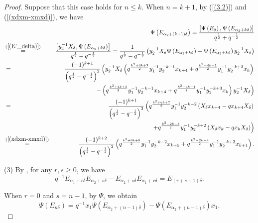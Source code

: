 \documentclass[reqno,11pt]{amsart}
\numberwithin{equation}{section}
\begin{document}
\begin{proof}
Suppose that this case holds for $n \le k$. When $n=k+1$, by (\ref{(3.2)}) and (\ref{(xdxm-xmxd)}), we have
\begin{eqnarray*}
	&& \Psi\left(E_{\alpha_2+(k+1) \delta}\right)=\frac{{\left[ {\Psi \left( {{E_\delta }} \right),\Psi \left( {{E_{{\alpha _2} + k\delta }}} \right)} \right]}}{{{q^{\frac{1}{2}}} + {q^{ - \frac{1}{2}}}}} \\
&	 \mathop  = \limits^{ (\ref{(E'_delta)})} & \frac{\left[y_2^{-1} X_\delta, \Psi\left(E_{\alpha_2+k \delta}\right)\right]}{q^{\frac{1}{2}}-q^{-\frac{1}{2}}}=\frac{1}{q^{\frac{1}{2}}-q^{-\frac{1}{2}}}\left(y_2^{-1} X_\delta \Psi\left(E_{\alpha_2+k \delta}\right)-\Psi\left(E_{\alpha_2+k \delta}\right) y_2^{-1} X_\delta\right) \\
&	= & \frac{(-1)^{k+1}}{\left(q^{\frac{1}{2}}-q^{-\frac{1}{2}}\right)^3}\left(y_2^{-1} X_\delta\left(q^{\frac{k^2+4 k+3}{2}} y_1^{-1} y_2^{-k-1} x_{k+4}+q^{\frac{k^2-4 k-1}{2}} y_1^{-1} y_2^{-k+3} x_k\right)\right. \\
&	& \left.-\left(q^{\frac{k^2+4 k+3}{2}} y_1^{-1} y_2^{-k-1} x_{k+4}+q^{\frac{k^2-4 k-1}{2}} y_1^{-1} y_2^{-k+3} x_k\right) y_2^{-1} X_\delta\right) \\
&	= & \frac{(-1)^{k+1}}{\left(q^{\frac{1}{2}}-q^{-\frac{1}{2}}\right)^3}\left(q^{\frac{k^2+6 k+7}{2}} y_1^{-1} y_2^{-k-2}\left(X_\delta x_{k+4}-q x_{k+4} X_\delta\right)\right. \\
&	& \left.+q^{\frac{k^2-2 k-5}{2}} y_1^{-1} y_2^{-k+2}\left(X_\delta x_k-q x_k X_\delta\right)\right) \\
&	 \mathop  = \limits^{(\ref{(xdxm-xmxd)})}& \frac{(-1)^{k+2}}{\left(q^{\frac{1}{2}}-q^{-\frac{1}{2}}\right)^2}\left(q^{\frac{k^2+6 k+8}{2}} y_1^{-1} y_2^{-k-2} x_{k+5}+q^{\frac{k^2-2 k-4}{2}} y_1^{-1} y_2^{-k+2} x_{k+1}\right) .
\end{eqnarray*}\endgroup

(3) By \cite{Ter19}, for any $r, s \ge 0$, we have
$$q^{-1} E_{\alpha_1+r \delta} E_{\alpha_2+s \delta}-E_{\alpha_2+s\delta} E_{\alpha_1+r \delta}=E_{(r+s+1) \delta} .$$

When $r=0$ and $s=n-1$, by $\Psi$, we obtain
$$\Psi\left(E_{n \delta}\right)=q^{-1} x_1 \Psi\left(E_{\alpha_2+(n-1) \delta}\right)-\Psi\left(E_{\alpha_2+(n-1) \delta}\right) x_1 .$$


\end{proof}
\end{document}
